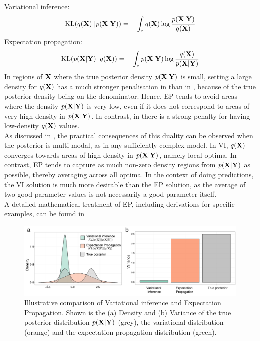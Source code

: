 Variational inference:
\begin{equation} \label{eq:kl_vb}
	{\rm KL}(q({\bf X})||p({\bf X}|{\bf Y})) = - \int_z q({\bf X}) \log \frac{p({\bf X}|{\bf Y})}{q({\bf X})}
\end{equation}
Expectation propagation:
\begin{equation} \label{eq:kl_ep}
	{\rm KL}(p({\bf X}|{\bf Y})||q({\bf X})) = - \int_z p({\bf X}|{\bf Y}) \log \frac{q({\bf X})}{p({\bf X}|{\bf Y})}
\end{equation}
In regions of ${\bf X}$ where the true posterior density $p({\bf X}|{\bf Y})$ is small, setting a large density for $q({\bf X})$ has a much stronger penalisation in  than in , because of the true posterior density being on the denominator. Hence, EP tends to avoid areas where the density $p({\bf X}|{\bf Y})$ is very low, even if it does not correspond to areas of very high-density in $p({\bf X}|{\bf Y})$. In contrast, in  there is a strong penalty for having low-density $q({\bf X})$ values.\\
As discussed in \cite{Bishop}, the practical consequences of this duality can be observed when the posterior is multi-modal, as in any sufficiently complex model. In VI, $q({\bf X})$ converges towards areas of high-density in $p({\bf X}|{\bf Y})$, namely local optima. In contrast, EP tends to capture as much non-zero density regions from $p({\bf X}|{\bf Y})$ as possible, thereby averaging across all optima. In the context of doing predictions, the VI solution is much more desirable than the EP solution, as the average of two good parameter values is not necessarily a good parameter itself.\\
A detailed mathematical treatment of EP, including derivations for specific examples, can be found in \cite{Bishop,Murphy,Minka2001}

\begin{figure}[H]
	\centering
	\includegraphics[width=1.0\linewidth]{VB_vs_EP}
	\caption{Illustrative comparison of Variational inference and Expectation Propagation. Shown is the (a) Density and (b) Variance of the true posterior distribution $p({\bf X}|{\bf Y})$ (grey), the variational distribution (orange) and the expectation propagation distribution (green).}
	\label{}
\end{figure}

